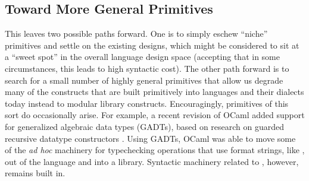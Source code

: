 \subsection{Toward More General Primitives}
This leaves two possible paths forward. One is to simply eschew ``niche'' primitives and settle on the existing designs, which might be considered to sit at a ``sweet spot'' in the overall language design space (accepting that in some circumstances, this leads to  high syntactic cost). 
The other path forward is to search for a small number of highly general primitives that allow us degrade many of the constructs that are built primitively into languages and their dialects today instead to modular library constructs. 
Encouragingly, primitives of this sort do occasionally arise. For example, a recent revision of OCaml added support for  generalized algebraic data types (GADTs), based on research on guarded recursive datatype constructors \cite{XiCheChe03}. Using GADTs, OCaml was able to move some of the \emph{ad hoc} machinery for typechecking operations that use format strings, like , out of the language and into a library. Syntactic machinery related to , however, remains built in. 






